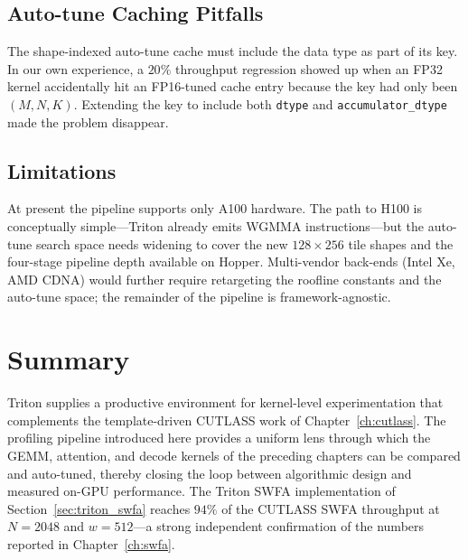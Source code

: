 \subsection{Auto-tune Caching
Pitfalls}\label{sec:triton_cache_pitfalls}
The shape-indexed auto-tune cache must include the data type as
part of its key. In our own experience, a $20\%$ throughput
regression showed up when an FP32 kernel accidentally hit an
FP16-tuned cache entry because the key had only been
$(M, N, K)$. Extending the key to include both \texttt{dtype} and
\texttt{accumulator\_dtype} made the problem disappear.

\subsection{Limitations}\label{sec:triton_limitations}
At present the pipeline supports only A100 hardware. The path
to H100 is conceptually simple---Triton already emits WGMMA
instructions---but the auto-tune search space needs widening to
cover the new $128 \times 256$ tile shapes and the four-stage
pipeline depth available on Hopper. Multi-vendor back-ends
(Intel Xe, AMD CDNA) would further require retargeting the
roofline constants and the auto-tune space; the remainder of the
pipeline is framework-agnostic.

\section{Summary}\label{sec:triton_summary}
Triton supplies a productive environment for kernel-level
experimentation that complements the template-driven CUTLASS
work of Chapter~\ref{ch:cutlass}. The profiling pipeline
introduced here provides a uniform lens through which the GEMM,
attention, and decode kernels of the preceding chapters can be
compared and auto-tuned, thereby closing the loop between
algorithmic design and measured on-GPU performance. The Triton
SWFA implementation of Section~\ref{sec:triton_swfa} reaches
$94\%$ of the CUTLASS SWFA throughput at $N = 2048$ and
$w = 512$---a strong independent confirmation of the numbers
reported in Chapter~\ref{ch:swfa}.
